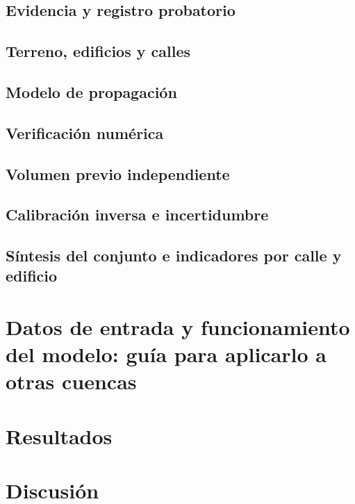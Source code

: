 \documentclass[10pt,a4paper]{article}
\begin{document}
\subsection{Evidencia y registro probatorio}\label{sec:evidencia}

\subsection{Terreno, edificios y calles}\label{sec:terreno}

\subsection{Modelo de propagación}\label{sec:modelo}

\subsection{Verificación numérica}\label{sec:verif}

\subsection{Volumen previo independiente}\label{sec:volumen}

\subsection{Calibración inversa e incertidumbre}\label{sec:calib}

\subsection{Síntesis del conjunto e indicadores por calle y edificio}\label{sec:sintesis}


\section{Datos de entrada y funcionamiento del modelo: guía para aplicarlo a otras cuencas}\label{sec:transferencia}


\section{Resultados}\label{sec:resultados}




\section{Discusión}\label{sec:discusion}

\end{document}
